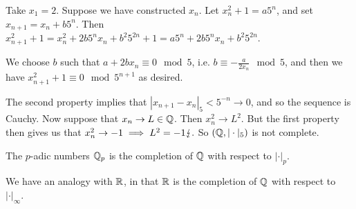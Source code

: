 \documentclass[10pt,a4paper]{article}
\begin{document}
Take $x_1 = 2$. Suppose we have constructed $x_n$. Let $x_n^2 + 1 = a5^n$, and set $x_{n+1} = x_n + b5^n$. Then $x_{n+1}^2 + 1=  x_n^2 + 2b5^nx_n + b^2 5^{2n} + 1 = a5^n + 2b5^nx_n + b^2 5^{2n}$.

We choose $b$ such that $a+2bx_n \equiv 0 \mod 5$, i.e. $b \equiv -\frac{a}{2x_n} \mod 5$, and then we have $x_{n+1}^2 +1 \equiv 0 \mod 5^{n+1}$ as desired.

The second property implies that $|x_{n+1} - x_n|_5 < 5^{-n} \to 0$, and so the sequence is Cauchy. Now suppose that $x_n \to L \in \mathbb{Q}$. Then $x_n^2 \to L^2$. But the first property then gives us that $x_n^2 \to -1 \implies L^2 = -1 \lightning.$ So $(\mathbb{Q}, |\cdot|_5)$ is not complete.

\begin{definition}
  The $p$-adic numbers $\mathbb{Q}_p$ is the completion of $\mathbb{Q}$ with respect to $|\cdot|_p$.
\end{definition}
We have an analogy with $\mathbb{R}$, in that $\mathbb{R}$ is the completion of $\mathbb{Q}$ with respect to $|\cdot|_\infty$.
\end{document}
